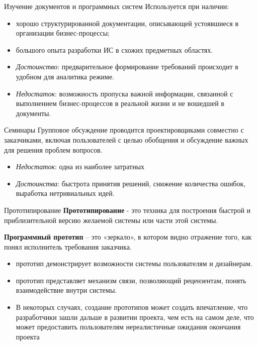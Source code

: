 \documentclass{beamer}
\begin{document}
\begin{frame}[t]{Изучение документов и программных систем}
Используется при наличии: 
\begin{itemize}
\item хорошо структурированной документации, описывающей устоявшиеся в организации
бизнес-процессы; 
\item большого опыта разработки ИС в схожих предметных областях.
\end{itemize}

\begin{itemize}
\item \textit{Достоинство}: предварительное формирование требований происходит в удобном
для аналитика режиме.
\item \textit{Недостаток}: возможность пропуска важной информации, связанной с выполнением
бизнес-процессов в реальной жизни и не вошедшей в документы.
\end{itemize}
\end{frame}

\begin{frame}[t]{Семинары}
Групповое обсуждение проводится проектировщиками совместно с
заказчиками, включая пользователей с целью обобщения и обсуждение важных для решения проблем вопросов.
\begin{itemize}
\item \textit{Недостаток}: одна из наиболее затратных
\item \textit{Достоинства}: быстрота принятия решений, снижение количества ошибок, выработка нетривиальных идей.
\end{itemize}
\end{frame}

\begin{frame}[t]{Прототипирование}
\textbf{Прототипирование} - это техника для построения быстрой и приблизительной версию
желаемой системы или части этой системы. 

\textbf{Программный прототип} – это «зеркало», в котором видно отражение того, как понял исполнитель требования заказчика.
\begin{itemize}
\item прототип демонстрирует возможности системы пользователям и дизайнерам. 
\item прототип представляет механизм связи, позволяющий рецензентам, понять взаимодействие внутри системы. 
\item В некоторых случаях, создание прототипов может создать впечатление, что разработчики зашли
дальше в развитии проекта, чем есть на самом деле, что может предоставить
пользователям нереалистичные ожидания окончания проекта
\end{itemize}
\end{frame}
\end{document}
